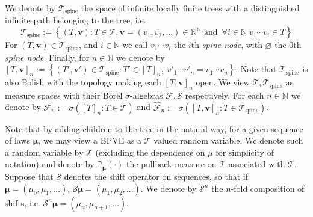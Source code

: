 \documentclass[12pt]{article}
\theoremstyle{definition}
\newcommand{\Prob}[2][]{\ensuremath{\mathbb{P}_{#1} \left(#2 \right)}}
\DeclareMathOperator{\spine}{spine}
\begin{document}
We denote by $\mathscr{T}_{\spine}$ the space of infinite locally finite trees with a distinguished infinite path belonging to the tree, i.e. 
\[
\mathscr{T}_{\spine} := \left\{(T, \boldsymbol{v})\colon  T \in \mathscr{T}, \boldsymbol{v} = (v_1, v_2, \ldots) \in \mathbb{N}^{\mathbb{N}} \text{ and } \, \forall i \in \mathbb{N} \; v_1\cdots v_i \in T \right\}
\] 
For $(T, \boldsymbol{v}) \in \mathscr{T}_{\spine}$, and $i \in \mathbb{N}$ we call $v_1 \cdots v_{i}$ the $i$th \emph{spine node}, with $\varnothing$ the $0$th \emph{spine node}. 
Finally, for $n \in \mathbb{N}$ we denote by $[T,\boldsymbol{v}]_{n} := \left\{(T', \boldsymbol{v}') \in \mathscr{T}_{\spine}\colon T' \in [T]_{n}, \; v'_1 \cdots v'_n = v_1 \cdots v_n\right\}.$ Note that $\mathscr{T}_{\spine}$ is also Polish with the topology making each $[T,\boldsymbol{v}]_{n}$ open. We view $\mathscr{T}, \mathscr{T}_{\spine}$ as measure spaces with their Borel $\sigma$-algebras $\mathscr{F}, \mathscr{S}$ respectively. For each $n \in \mathbb{N}$ we denote by $\mathscr{F}_{n} := \sigma\left([T]_{n}\colon T \in \mathscr{T}\right)$ and $\widehat{\mathscr{F}}_{n} := \sigma\left([T, \boldsymbol{v}]_{n}\colon T \in \mathscr{T}_{\spine}\right)$.  

Note that by adding children to the tree in the natural way, for a given sequence of laws $\boldsymbol{\mu}$, we may view a BPVE as a $\mathscr{T}$ valued random variable. We denote such a random variable by $\mathcal{T}$ (excluding the dependence on $\mu$ for simplicity of notation) and denote by $\Prob[\boldsymbol{\mu}]{\cdot}$ the pullback measure on $\mathscr{T}$ associated with $\mathcal{T}$. Suppose that $\mathcal{S}$ denotes the shift operator on sequences, so that if $\boldsymbol{\mu} = (\mu_0, \mu_1, \ldots)$, $\mathcal{S}\boldsymbol{\mu} = (\mu_1, \mu_2, \ldots)$. We denote by $\mathcal{S}^{n}$ the $n$-fold composition of shifts, i.e. $\mathcal{S}^n\boldsymbol{\mu} = (\mu_{n}, \mu_{n+1}, \ldots)$. 
\end{document}
